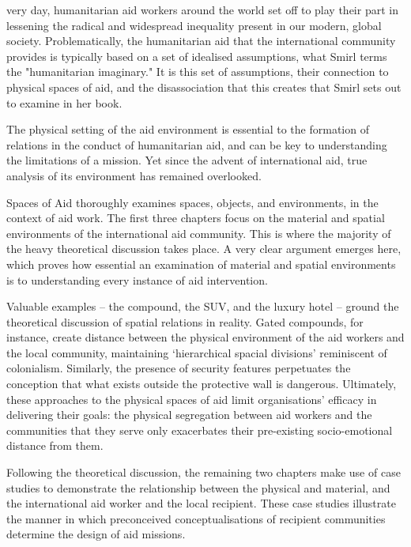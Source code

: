 
   very day, humanitarian aid workers around the world set off to play
   their part in lessening the radical and widespread inequality present
   in our modern, global society. Problematically, the humanitarian aid
   that the international community  provides is typically based on a set
   of idealised assumptions, what Smirl terms the "humanitarian
   imaginary." It is this set of assumptions, their connection to physical
   spaces of aid, and the disassociation that this creates that Smirl sets
   out to examine in her book.

   The physical setting of the aid environment is essential to the
   formation of relations in the conduct of humanitarian aid, and can be
   key to understanding the limitations of a mission. Yet since the advent
   of international aid, true analysis of its environment has remained
   overlooked.

   Spaces of Aid thoroughly examines spaces, objects, and environments, in
   the context of aid work. The first three chapters focus on the material
   and spatial environments of the international aid community. This is
   where the majority of the heavy theoretical discussion takes place. A
   very clear argument emerges here, which proves how essential an
   examination of material and spatial environments is to understanding
   every instance of aid intervention.

   Valuable examples -- the compound, the SUV, and the luxury hotel --
   ground the theoretical discussion of spatial relations in reality.
   Gated compounds, for instance, create distance between the physical
   environment of the aid workers and the local community, maintaining
   `hierarchical spacial divisions' reminiscent of colonialism. Similarly,
   the presence of security features perpetuates the conception that what
   exists outside the protective wall is dangerous. Ultimately, these
   approaches to the physical spaces of aid limit organisations' efficacy
   in delivering their goals: the physical segregation between aid workers
   and the communities that they serve only exacerbates their pre-existing
   socio-emotional distance from them.

   Following the theoretical discussion, the remaining two chapters make
   use of case studies to demonstrate the relationship between the
   physical and material, and the international aid worker and the local
   recipient. These case studies illustrate the manner in which
   preconceived conceptualisations of recipient communities determine the
   design of aid missions.

